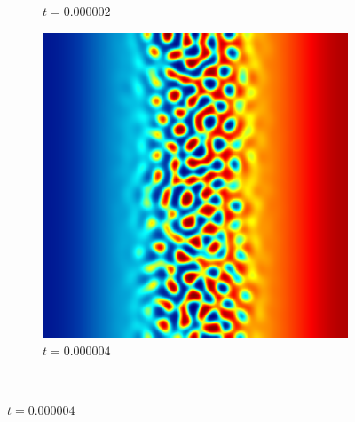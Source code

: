 \begin{figure}[ht]
\begin{subfigure}[t]{.3\linewidth}
		\vspace{-.4\baselineskip}
		\caption{$t=0.000002$}
	\end{subfigure}
	\begin{subfigure}[t]{.3\linewidth}
		\center
		\includegraphics[scale=.25]{linear_ch_2_4}
		\vspace{-.4\baselineskip}
		\caption{$t=0.000004$}
	\end{subfigure}\\
	\vspace{.2\baselineskip}


\end{figure}
